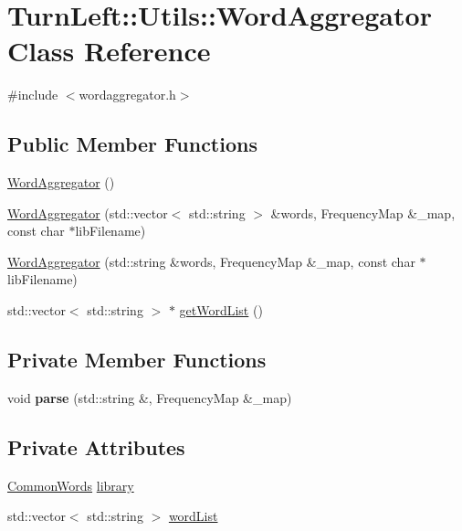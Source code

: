 \hypertarget{classTurnLeft_1_1Utils_1_1WordAggregator}{
\section{TurnLeft::Utils::WordAggregator Class Reference}
\label{classTurnLeft_1_1Utils_1_1WordAggregator}
}


{\ttfamily \#include $<$wordaggregator.h$>$}

\subsection*{Public Member Functions}
\begin{DoxyCompactItemize}
\item 
\hyperlink{classTurnLeft_1_1Utils_1_1WordAggregator_a721da98f0dec33c9abadd19c04669165}{WordAggregator} ()
\item 
\hyperlink{classTurnLeft_1_1Utils_1_1WordAggregator_a10b5f069149857994a6db20e21e9ca11}{WordAggregator} (std::vector$<$ std::string $>$ \&words, FrequencyMap \&\_\-map, const char $\ast$libFilename)
\item 
\hyperlink{classTurnLeft_1_1Utils_1_1WordAggregator_a9e1a0859a5a78786c59ccaebd30440e7}{WordAggregator} (std::string \&words, FrequencyMap \&\_\-map, const char $\ast$libFilename)
\item 
std::vector$<$ std::string $>$ $\ast$ \hyperlink{classTurnLeft_1_1Utils_1_1WordAggregator_a270d7b8a0a2b45b0ec5d2f8ef1911e0f}{getWordList} ()
\end{DoxyCompactItemize}
\subsection*{Private Member Functions}
\begin{DoxyCompactItemize}
\item 
\hypertarget{classTurnLeft_1_1Utils_1_1WordAggregator_aad3c3827967a9b9e742dce95e28c96aa}{
void {\bfseries parse} (std::string \&, FrequencyMap \&\_\-map)}
\label{classTurnLeft_1_1Utils_1_1WordAggregator_aad3c3827967a9b9e742dce95e28c96aa}

\end{DoxyCompactItemize}
\subsection*{Private Attributes}
\begin{DoxyCompactItemize}
\item 
\hyperlink{classTurnLeft_1_1Utils_1_1CommonWords}{CommonWords} \hyperlink{classTurnLeft_1_1Utils_1_1WordAggregator_a51f9ddd22dab31dc20cb6c80cdd5711f}{library}
\item 
std::vector$<$ std::string $>$ \hyperlink{classTurnLeft_1_1Utils_1_1WordAggregator_a98ee20472e3bf576f23e3b525ab317fc}{wordList}
\end{DoxyCompactItemize}


